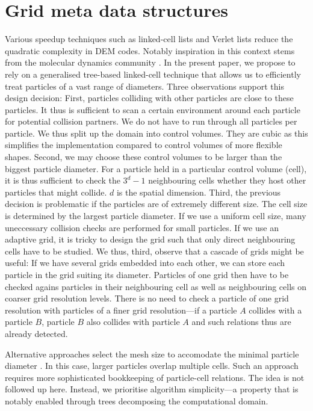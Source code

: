 \section{Grid meta data structures}
\label{section:grid}

Various speedup techniques such as linked-cell lists \cite{xxx} and Verlet lists
\cite{xxxx} reduce the quadratic complexity in DEM codes.
Notably inspiration in this context stems from the molecular dynamics community
\cite{mattutis:24,wolfgang}. 
In the present paper, we propose to rely on a generalised tree-based linked-cell
technique that allows us to efficiently treat particles of a vast range of diameters.
Three observations support this design decision:
First, particles colliding with other particles are close to these particles.
It thus is sufficient to scan a certain environment around each particle for
potential collision partners.
We do not have to run through all particles per particle.
We thus split up the domain into control volumes.
They are cubic as this simplifies the implementation compared to control volumes
of more flexible shapes.
Second, we may choose these control volumes to be larger than the biggest
particle diameter. 
For a particle held in a particular control volume (cell), it is thus sufficient
to check the $3^d-1$ neighbouring cells whether they host other particles that
might collide. 
$d$ is the spatial dimension.
Third, the previous decision is problematic if the particles are of extremely
different size. 
The cell size is determined by the largest particle diameter. 
If we use a uniform cell size, many uneccessary collision checks are performed
for small particles.
If we use an adaptive grid, it is tricky to design the grid such that only
direct neighbouring cells have to be studied.
We thus, third, observe that a cascade of grids might be useful: If we have
several grids embedded into each other, we can store each particle in the grid
suiting its diameter.
Particles of one grid then have to be checked agains particles in their
neighbouring cell as well as neighbouring cells on coarser grid resolution
levels.
There is no need to check a particle of one grid resolution with particles of a
finer grid resolution---if a particle $A$ collides with a particle $B$, particle
$B$ also collides with particle $A$ and such relations thus are already
detected.


Alternative approaches select the mesh size to accomodate the minimal particle
diameter \cite{mattutis}.
In this case, larger particles overlap multiple cells.
Such an approach requires more sophisticated bookkeeping of particle-cell
relations. 
The idea is not followed up here.
Instead, we prioritise algorithm simplicity---a property that is notably enabled
through trees decomposing the computational domain.



